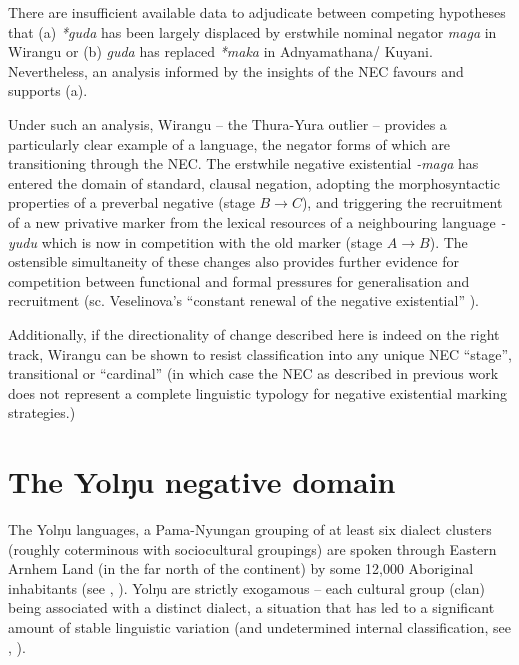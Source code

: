 \documentclass[output=paper]{langsci/langscibook}
\begin{document}
There are insufficient available data to adjudicate between competing
hypotheses that (a) \textit{*guda} has been largely displaced by erstwhile
nominal negator \textit{maga} in Wirangu or (b) \textit{guda}
has replaced \textit{*maka} in Adnyamathana\slash
Kuyani. Nevertheless, an analysis informed by the insights of the NEC favours and supports (a).
 
Under such an analysis, Wirangu -- the Thura-Yura outlier -- provides a particularly clear example of a language, the negator forms of which are transitioning through the NEC. The erstwhile negative existential \textit{-maga} has entered the domain of standard, clausal negation, adopting the morphosyntactic properties of a preverbal negative (stage $B\to C$), and triggering the recruitment of a new privative marker from the lexical resources of a neighbouring language \textit{-yudu} which is now in competition with the old marker (stage $A\to B$). The ostensible simultaneity of these changes also provides further evidence for competition between functional and formal pressures for generalisation and recruitment (sc. Veselinova's ``constant renewal of the negative existential'' \citeyearpar[173]{Veselinova2016}).

Additionally, if the directionality of change described here is indeed on
the right track, Wirangu can be shown to resist classification
into any unique NEC ``stage'', transitional or ``cardinal'' (in which case
the NEC as described in previous work does not represent a complete
linguistic typology for negative existential marking
strategies.)

\section{The Yolŋu negative domain}\label{sec:austr-4}

The Yolŋu languages, a Pama-Nyungan grouping of at least six dialect clusters (roughly coterminous with sociocultural groupings) are spoken through Eastern Arnhem Land (in the far north of the continent) by some 12,000 Aboriginal inhabitants (see \citealt[18ff]{Wilkinson1991}, \citealt{Bowern2009}). Yolŋu are strictly exogamous -- each cultural group (clan) being associated with a distinct dialect, a situation that has led to a significant amount of stable linguistic variation (and undetermined internal classification, see \citealt{Schebeck2001}, \citealt[836]{BowernAtkinson2012}).
\end{document}
